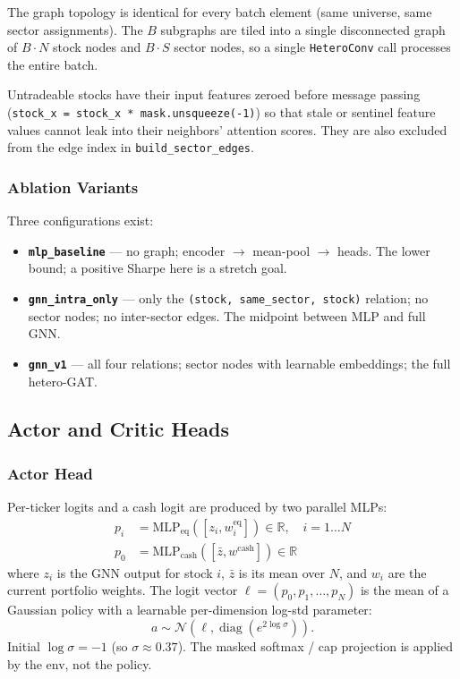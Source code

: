 \documentclass[11pt,a4paper]{article}
\begin{document}
The graph topology is identical for every batch element (same universe, same sector
assignments). The $B$ subgraphs are tiled into a single disconnected graph of $B \cdot N$
stock nodes and $B \cdot S$ sector nodes, so a single \texttt{HeteroConv} call processes
the entire batch.

Untradeable stocks have their input features zeroed before message passing
(\texttt{stock\_x = stock\_x * mask.unsqueeze(-1)}) so that stale or sentinel feature
values cannot leak into their neighbors' attention scores. They are also excluded
from the edge index in \texttt{build\_sector\_edges}.

\subsubsection{Ablation Variants}

Three configurations exist:
\begin{itemize}
\item \textbf{\texttt{mlp\_baseline}} --- no graph; encoder $\to$ mean-pool $\to$ heads.
The lower bound; a positive Sharpe here is a stretch goal.
\item \textbf{\texttt{gnn\_intra\_only}} --- only the
\texttt{(stock, same\_sector, stock)} relation; no sector nodes; no inter-sector edges.
The midpoint between MLP and full GNN.
\item \textbf{\texttt{gnn\_v1}} --- all four relations; sector nodes with learnable
embeddings; the full hetero-GAT.
\end{itemize}

\subsection{Actor and Critic Heads}

\subsubsection{Actor Head}

Per-ticker logits and a cash logit are produced by two parallel MLPs:
\begin{align}
p_i &= \text{MLP}_{\text{eq}}([z_i, w_i^{\text{eq}}]) \in \mathbb{R}, \quad i = 1 \ldots N \\
p_0 &= \text{MLP}_{\text{cash}}([\bar{z}, w^{\text{cash}}]) \in \mathbb{R}
\end{align}
where $z_i$ is the GNN output for stock $i$, $\bar{z}$ is its mean over $N$, and
$w_i$ are the current portfolio weights. The logit vector
$\ell = (p_0, p_1, \ldots, p_N)$ is the mean of a Gaussian policy with a learnable
per-dimension log-std parameter:
\[ a \sim \mathcal{N}(\ell, \operatorname{diag}(e^{2 \log\sigma})). \]
Initial $\log \sigma = -1$ (so $\sigma \approx 0.37$). The masked softmax / cap
projection is applied by the env, not the policy.
\end{document}
